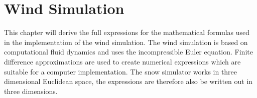\chapter{Wind Simulation}
\label{chap:windsim}

This chapter will derive the full expressions for the mathematical formulas 
used in the implementation of the wind simulation. The wind simulation is 
based on computational fluid dynamics and uses the incompressible Euler 
equation. Finite difference approximations are used to create numerical 
expressions which are suitable for a computer implementation. The snow simulator 
works in three dimensional Euclidean space, the expressions are therefore also be 
written out in three dimensions. 

